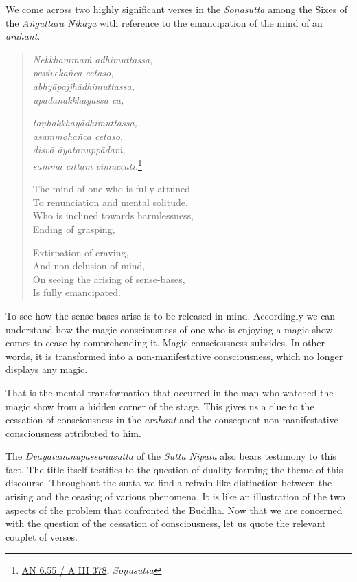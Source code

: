 We come across two highly significant verses in the \emph{Soṇasutta} among the Sixes of the \emph{Aṅguttara Nikāya} with reference to the emancipation of the mind of an \emph{arahant}.

\begin{quote}
\emph{Nekkhammaṁ adhimuttassa,}\\
\emph{pavivekañca cetaso,}\\
\emph{abhyāpajjhādhimuttassa,}\\
\emph{upādānakkhayassa ca,}

\emph{taṇhakkhayādhimuttassa,}\\
\emph{asammohañca cetaso,}\\
\emph{disvā āyatanuppādaṁ,}\\
\emph{sammā cittaṁ vimuccati.}\footnote{\href{https://suttacentral.net/an6.55/pli/ms}{AN 6.55 / A III 378}, \emph{Soṇasutta}}

\clearpage

The mind of one who is fully attuned\\
To renunciation and mental solitude,\\
Who is inclined towards harmlessness,\\
Ending of grasping,

Extirpation of craving,\\
And non-delusion of mind,\\
On seeing the arising of sense-bases,\\
Is fully emancipated.
\end{quote}

To see how the sense-bases arise is to be released in mind. Accordingly we can understand how the magic consciousness of one who is enjoying a magic show comes to cease by comprehending it. Magic consciousness subsides. In other words, it is transformed into a non-manifestative consciousness, which no longer displays any magic.

That is the mental transformation that occurred in the man who watched the magic show from a hidden corner of the stage. This gives us a clue to the cessation of consciousness in the \emph{arahant} and the consequent non-manifestative consciousness attributed to him.

The \emph{Dvāyatanānupassanasutta} of the \emph{Sutta Nipāta} also bears testimony to this fact. The title itself testifies to the question of duality forming the theme of this discourse. Throughout the sutta we find a refrain-like distinction between the arising and the ceasing of various phenomena. It is like an illustration of the two aspects of the problem that confronted the Buddha. Now that we are concerned with the question of the cessation of consciousness, let us quote the relevant couplet of verses.

